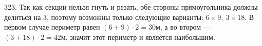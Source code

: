 323. Так как секции нельзя гнуть и резать, обе стороны прямоугольника должны делиться на 3, поэтому возможны только следующие варианты: $6\times9,\ 3\times18.$ В первом случае периметр равен $(6+9)\cdot2=30$м, а во втором --- $(3+18)\cdot2=42$м, значит этот периметр и является наибольшим.\\
